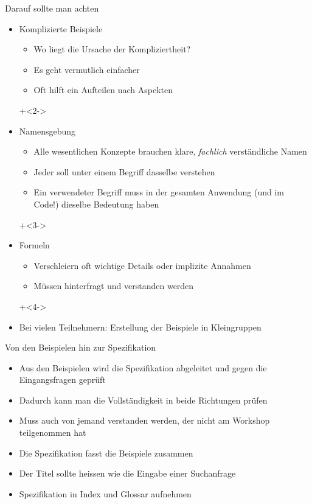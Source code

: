 \begin{frame}{Darauf sollte man achten}

\begin{itemize}
	\item Komplizierte Beispiele
	\begin{itemize}
		\item Wo liegt die Ursache der Kompliziertheit?
		\item Es geht vermutlich einfacher
		\item Oft hilft ein Aufteilen nach Aspekten
	\end{itemize}
	
\onslide+<2->
	
	\item Namensgebung
	\begin{itemize}
		\item Alle wesentlichen Konzepte brauchen klare, \emph{fachlich} verständliche Namen
		\item Jeder soll unter einem Begriff dasselbe verstehen
		\item Ein verwendeter Begriff muss in der gesamten Anwendung (und im Code!) dieselbe Bedeutung haben
	\end{itemize}
	
\onslide+<3->
	
	\item Formeln
	\begin{itemize}
		\item Verschleiern oft wichtige Details oder implizite Annahmen
		\item Müssen hinterfragt und verstanden werden
	\end{itemize}
	
\onslide+<4->
	
	\item Bei vielen Teilnehmern: Erstellung der Beispiele in Kleingruppen
\end{itemize}

\end{frame}



\begin{frame}{Von den Beispielen hin zur Spezifikation}

\begin{itemize}
	\item Aus den Beispielen wird die Spezifikation abgeleitet und gegen die Eingangsfragen geprüft
	\item Dadurch kann man die Vollständigkeit in beide Richtungen prüfen
	\item Muss auch von jemand verstanden werden, der nicht am Workshop teilgenommen hat
	\item Die Spezifikation fasst die Beispiele zusammen
	\item Der Titel sollte heissen wie die Eingabe einer Suchanfrage
	\item Spezifikation in Index und Glossar aufnehmen
\end{itemize}

\end{frame}
 
